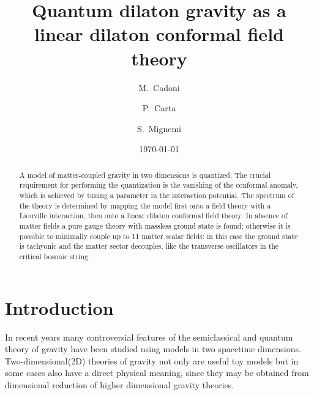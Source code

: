 \documentclass[a4paper,aps,prd,twocolumn,groupedaddress]{revtex4}
\begin{document}
\preprint{INFNCA-TH0201]}

\title{Quantum dilaton gravity as a linear dilaton conformal field theory}

\author{M.~Cadoni}
\author{P.~Carta}

\author{S.~Mignemi}


\date{\today}

\begin{abstract}
A model of matter-coupled gravity in two dimensions is quantized.  The
crucial requirement for performing the quantization is the vanishing
of the conformal anomaly, which is achieved by tuning a parameter in
the interaction potential. The spectrum of the theory is determined by
mapping the model first onto a field theory with a Liouville
interaction, then onto a linear dilaton conformal field theory. In
absence of matter fields a pure gauge theory with massless ground
state is found; otherwise it is possible to minimally couple up to 11
matter scalar fields: in this case the ground state is tachyonic and the
matter sector decouples, like the transverse oscillators in the
critical bosonic string.

\end{abstract}


\maketitle


\section{Introduction}
In recent years many controversial features of the semiclassical and quantum 
theory of gravity have been studied using models in two spacetime dimensions.
Two-dimensional(2D) theories of gravity  not only are useful toy models
but in some cases also have a direct physical meaning, since they
may be obtained from dimensional reduction of higher dimensional
gravity theories.
\end{document}
